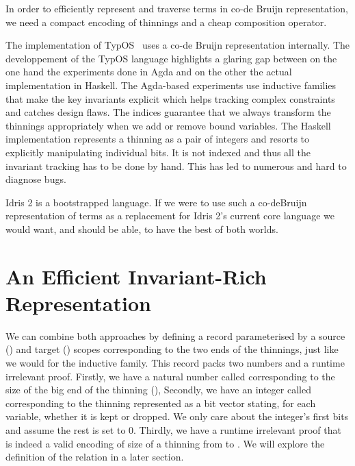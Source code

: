 \documentclass{article}
\newcommand{\typos}{TypOS}
\newcommand{\idris}{Idris 2}
\begin{document}

In order to efficiently represent and traverse terms in co-de Bruijn representation,
we need a compact encoding of thinnings and a cheap composition operator.

The implementation of \typos~\cite{MANUAL:talk/types/Allais22} uses a co-de Bruijn
representation internally. 
%
The developpement of the \typos{} language highlights a glaring gap between on the
one hand the experiments done in Agda and on the other the actual implementation
in Haskell.
%
The Agda-based experiments use inductive families that make the key invariants explicit
which helps tracking complex constraints and catches design flaws. The indices guarantee
that we always transform the thinnings appropriately when we add or remove bound variables.
%
The Haskell implementation represents a thinning as a pair of integers and resorts to
explicitly manipulating individual bits. It is not indexed and thus all the invariant
tracking has to be done by hand. This has led to numerous and hard to diagnose bugs.

\idris{} is a bootstrapped language. If we were to use such a co-deBruijn representation
of terms as a replacement for \idris{}'s current core language we would want, and should
be able, to have the best of both worlds.

\section{An Efficient Invariant-Rich Representation}

We can combine both approaches by defining a record parameterised by a source
() and target () scopes corresponding to the two
ends of the thinnings, just like we would for the inductive family. This record
packs two numbers and a runtime irrelevant proof.
%
Firstly, we have a natural number called  corresponding
to the size of the big end of the thinning (),
%
Secondly, we have an integer called  corresponding to
the thinning represented as a bit vector stating, for each variable, whether
it is kept or dropped. We only care about the integer's 
first bits and assume the rest is set to 0.
%
Thirdly, we have a runtime irrelevant proof  that
 is indeed a valid encoding of size 
of a thinning from  to . We will explore the
definition of the relation  in a later section.
\end{document}
